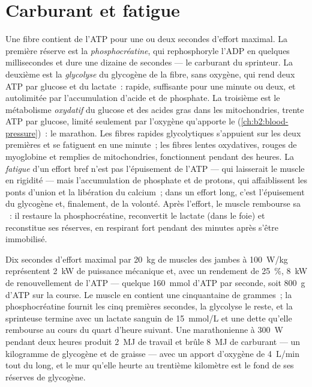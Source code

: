 \section{Carburant et fatigue}

\begin{proposition}\label{prop:b2:muscle-movement:energy}
Une fibre contient de l'ATP pour une ou deux secondes d'effort maximal.
La première réserve est la \emph{phosphocréatine}, qui rephosphoryle
l'ADP en quelques millisecondes et dure une dizaine de secondes --- le
carburant du sprinteur. La deuxième est la \emph{glycolyse} du glycogène
de la fibre, sans oxygène, qui rend deux ATP par glucose et du lactate~:
rapide, suffisante pour une minute ou deux, et autolimitée par
l'accumulation d'acide et de phosphate. La troisième est le métabolisme
\emph{oxydatif} du glucose et des acides gras dans les mitochondries,
trente ATP par glucose, limité seulement par l'oxygène qu'apporte le 
(\cref{ch:b2:blood-pressure})~: le marathon. Les fibres rapides
glycolytiques s'appuient sur les deux premières et se fatiguent en une
minute~; les fibres lentes oxydatives, rouges de myoglobine et remplies de
mitochondries, fonctionnent pendant des heures.
La \emph{fatigue} d'un effort bref n'est pas l'épuisement de l'ATP ---
qui laisserait le muscle en rigidité --- mais l'accumulation de phosphate
et de protons, qui affaiblissent les ponts d'union et la libération du
calcium~; dans un effort long, c'est l'épuisement du glycogène et,
finalement, de la volonté. Après l'effort, le muscle rembourse sa
\emph{}~: il restaure la phosphocréatine, reconvertit le
lactate (dans le foie) et reconstitue ses réserves, en respirant fort
pendant des minutes après s'être immobilisé.
\end{proposition}

\begin{example}\label{ex:b2:muscle-movement:sprint}
Dix secondes d'effort maximal par \qty{20}{kg} de muscles des jambes à
\qty{100}{W/kg} représentent \qty{2}{kW} de puissance mécanique et, avec
un rendement de \qty{25}{\%}, \qty{8}{kW} de renouvellement de l'ATP ---
quelque \qty{160}{mmol} d'ATP par seconde, soit \qty{800}{g} d'ATP sur la course.
Le muscle en contient une cinquantaine de grammes~; la phosphocréatine fournit les
cinq premières secondes, la glycolyse le reste, et la sprinteuse termine
avec un lactate sanguin de \qty{15}{mmol/L} et une dette qu'elle
rembourse au cours du quart d'heure suivant. Une marathonienne à
\qty{300}{W} pendant deux heures produit \qty{2}{MJ} de travail et brûle
\qty{8}{MJ} de carburant --- un kilogramme de glycogène et de graisse ---
avec un apport d'oxygène de \qty{4}{L/min} tout du long, et le mur
qu'elle heurte au trentième kilomètre est le fond de ses réserves de
glycogène.
\end{example}

